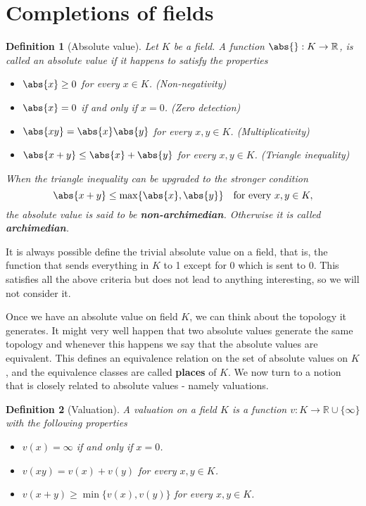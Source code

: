 \documentclass{article}
\newtheorem{definition}{Definition}[section]
\newcommand{\mbb}[1]{\mathbb{#1}}
\begin{document}
\section*{Completions of fields}

\begin{definition}[Absolute value]
    Let $K$ be a field. A function $\abs{} : K \to \mbb R$, is called an absolute value if it happens to satisfy the properties
    \begin{itemize}
        \item $\abs{x} \geq 0$ for every $x \in K$. (Non-negativity)
        \item $\abs{x} = 0$ if and only if $x = 0$. (Zero detection)
        \item $\abs{xy} = \abs{x} \abs{y}$ for every $x,y \in K$. (Multiplicativity)
        \item $\abs{x + y} \leq \abs{x} + \abs{y}$ for every $x,y \in K$. (Triangle inequality)
    \end{itemize}
    When the triangle inequality can be upgraded to the stronger condition $$\abs{x + y} \leq \max \{\abs{x}, \abs{y}\} \quad \text{for every } x,y \in K,$$
    the absolute value is said to be \textbf{non-archimedian}. Otherwise it is called \textbf{archimedian}.
\end{definition}
It is always possible define the trivial absolute value on a field, that is, the function that sends everything in $K$ to 1 except for 0 which is sent to 0. This satisfies all the above criteria but does not lead to anything interesting, so we will not consider it.

Once we have an absolute value on field $K$, we can think about the topology it generates. It might very well happen that two absolute values generate the same topology and whenever this happens we say that the absolute values are equivalent. This defines an equivalence relation on the set of absolute values on $K$, and the equivalence classes are called \textbf{places} of $K$. We now turn to a notion that is closely related to absolute values - namely valuations. 

\begin{definition}[Valuation]
    A valuation on a field $K$ is a function $v : K \to \mbb R \cup \{\infty\}$ with the following properties 
    \begin{itemize}
        \item $v(x) = \infty$ if and only if $x = 0$.
        \item $v(xy) = v(x) + v(y)$ for every $x,y \in K$. 
        \item $v(x + y) \geq \min \{v(x), v(y)\}$ for every $x,y \in K$.
    \end{itemize}
\end{definition}
\end{document}
